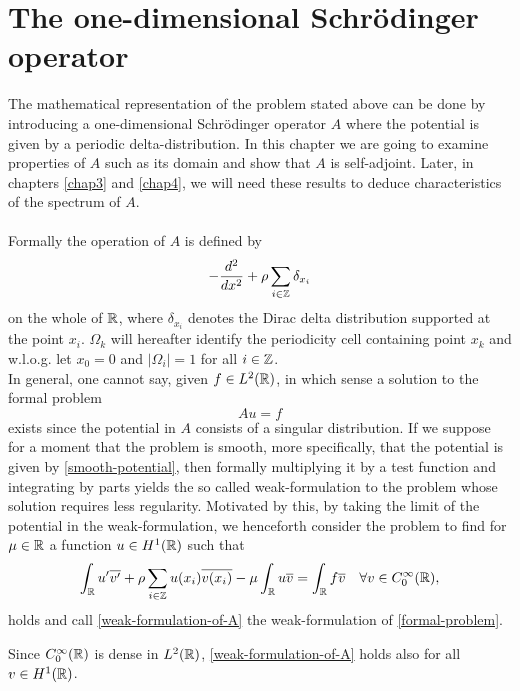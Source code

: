 \chapter{The one-dimensional Schrödinger operator} \label{chap2}

The mathematical representation of the problem stated above can be done by introducing a one-dimensional Schrödinger operator $A$ where the potential is given by a periodic delta-distribution. In this chapter we are going to examine properties of $A$ such as its domain and show that $A$ is self-adjoint. Later, in chapters \ref{chap3} and \ref{chap4}, we will need these results to deduce characteristics of the spectrum of $A$. ~\\ ~\\
Formally the operation of $A$ is defined by
\begin{equation}
	- \frac{d^{2}}{dx^{2}} + \rho \sum_{i \in \mathbb{Z}} \delta_{x_{i}} \label{the-operator-A-formally}
\end{equation}
on the whole of $\mathbb{R}$, where $\delta_{x_{i}}$ denotes the Dirac delta distribution supported at the point $x_{i}$. $\Omega_{k}$ will hereafter identify the periodicity cell containing point $x_{k}$ and w.l.o.g. let $x_{0} = 0$ and $|\Omega_{i}| = 1$ for all $i \in \mathbb{Z}$.
~\\  
In general, one cannot say, given $f \in L^{2}(\mathbb{R})$, in which sense a solution to the formal problem 
	\begin{equation}
		Au = f \label{formal-problem}
	\end{equation}
	exists since the potential in $A$ consists of a singular distribution. If we suppose for a moment that the problem is smooth, more specifically, that the potential is given by \eqref{smooth-potential}, then formally multiplying it by a test function and integrating by parts yields the so called weak-formulation to the problem whose solution requires less regularity. Motivated by this, by taking the limit of the potential in the weak-formulation, we henceforth consider the problem to find for $\mu \in \mathbb{R}$ a function $u \in H^{1}(\mathbb{R})$ such that 
\begin{equation}
	\int_{\mathbb{R}} u' \overline{v'} + \rho \sum_{i \in \mathbb{Z}} u(x_{i}) \overline{v(x_{i})} - \mu \int_{\mathbb{R}} u \overline{v} = \int_{\mathbb{R}} f \overline{v} \quad \forall v \in C_{0}^{\infty}(\mathbb{R}), \label{weak-formulation-of-A}
\end{equation}	
holds and call \eqref{weak-formulation-of-A} the weak-formulation of \eqref{formal-problem}.
\begin{remark}
	Since $C_{0}^{\infty}(\mathbb{R})$ is dense in $L^{2}(\mathbb{R})$, \eqref{weak-formulation-of-A} holds also for all $v \in H^{1}(\mathbb{R})$.
\end{remark}
